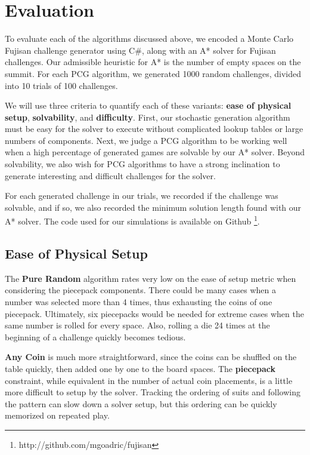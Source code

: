 \documentclass[10pt,journal,compsoc]{IEEEtran}
\begin{document}
\section{Evaluation}

 \noindent
To evaluate each of the algorithms discussed above, we encoded a Monte Carlo Fujisan challenge generator using C\#, along with an A* solver for Fujisan challenges. Our admissible heuristic for A* is the number of empty spaces on the summit. For each PCG algorithm, we generated 1000 random challenges, divided into 10 trials of 100 challenges. 

We will use three criteria to quantify each of these variants:
{\bf ease of physical setup}, {\bf solvability}, and {\bf difficulty}.  First, our stochastic 
generation algorithm must be easy for the solver to execute without complicated lookup tables or large numbers of components. Next, we judge a PCG algorithm to be working well when a high percentage of generated games are solvable by our A* solver. Beyond solvability, we also wish for PCG algorithms to have a strong inclination to generate interesting and difficult challenges for the solver. 

For each generated challenge in our trials, we recorded if the challenge was solvable, and if so, we also recorded the minimum solution length found with our A* solver. The code used for our simulations is available on Github \footnote{http://github.com/mgoadric/fujisan}. 

\subsection{Ease of Physical Setup}

The {\bf Pure Random} algorithm rates very low on the ease of setup metric when considering the piecepack components. There could be many cases when a number was selected more than 4 times, thus exhausting the coins of one piecepack. Ultimately, six piecepacks would be needed for extreme cases when the same number is rolled for every space. Also, rolling a die 24 times at the beginning of a challenge quickly becomes tedious. 

{\bf Any Coin} is much more straightforward, since the coins can be shuffled on the table quickly, then added one by one to the board spaces. The {\bf piecepack} constraint, while equivalent in the number of actual coin placements, is a little more difficult to setup by the solver. Tracking the ordering of suits and following the pattern can slow down a solver setup, but this ordering can be quickly memorized on repeated play.
\end{document}
